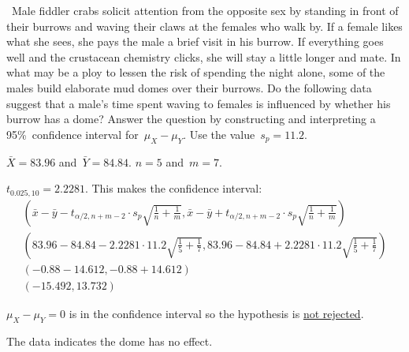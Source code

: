 \begin{problem}
  ~Male fiddler crabs solicit attention from the opposite sex by standing in front of their burrows and waving their claws at the females who walk by. If a female likes what she sees, she pays the male a brief visit in his burrow. If everything goes well and the crustacean chemistry clicks, she will stay a little longer and mate. In what may be a ploy to lessen the risk of spending the night alone, some of the males build elaborate mud domes over their burrows. Do the following data suggest that a male's time spent waving to females is influenced by whether his burrow has a dome? Answer the question by constructing and interpreting a 95\%~confidence interval for~${\mu_{X} - \mu_{Y}}$. Use the value~${s_p = 11.2}$.
\end{problem}

\noindent
${\bar{X} = 83.96}$ and~${\bar{Y} = 84.84}$. ${n = 5}$ and~${m = 7}$.

\noindent
${t_{0.025,10} = 2.2281}$.  This makes the confidence interval:
\begin{align}
  \left(\bar{x} - \bar{y} - t_{\alpha/2,n+m-2} \cdot s_p\sqrt{\frac{1}{n} + \frac{1}{m}},\bar{x} - \bar{y} + t_{\alpha/2,n+m-2} \cdot s_p\sqrt{\frac{1}{n} + \frac{1}{m}}\right) \\
  \left(83.96 - 84.84 - 2.2281 \cdot 11.2 \sqrt{\frac{1}{5} + \frac{1}{7}}, 83.96 - 84.84 + 2.2281 \cdot 11.2 \sqrt{\frac{1}{5} + \frac{1}{7}}\right) \\
  \left(-0.88 - 14.612, -0.88 + 14.612\right) \\
  \left(-15.492, 13.732\right)
\end{align}

\noindent
${\mu_{X} - \mu_{Y} = 0}$ is in the confidence interval so the hypothesis is \underline{not rejected}.

The data indicates the dome has no effect.
